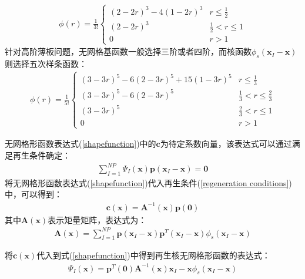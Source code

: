 \documentclass[a4paper]{ctexbook}
\begin{document}
\begin{equation}
\begin{split}
    \phi(r)=\frac{1}{3!}
\begin{cases}
    (2-2r)^3-4(1-2r)^3 &r\le \frac{1}{2}\\
    (2-2r)^3&\frac{1}{2}<r\le 1\\
    0&r>1
\end{cases}
\end{split}
\end{equation}
针对高阶薄板问题，无网格基函数一般选择三阶或者四阶，而核函数$\phi_s(\pmb{x}_I-\pmb{x})$则选择五次样条函数：
\begin{equation}
\begin{split}
    \phi(r)=\frac{1}{5!}
\begin{cases}
    (3-3r)^5-6(2-3r)^5+15(1-3r)^5&r\le\frac{1}{3}\\
    (3-3r)^5-6(2-3r)^5&\frac{1}{3}<r\le\frac{2}{3}\\
    (3-3r)^5&\frac{2}{3}<r\le1\\
    0&r>1
\end{cases}
\end{split}
\end{equation}\par
无网格形函数表达式(\ref{shapefunction})中的$\pmb{c}$为待定系数向量，该表达式可以通过满足再生条件确定：
\begin{equation}\label{regeneration conditions}
\begin{split}
    \sum_{I=1}^{N\!P}\Psi_I(\pmb{x})\pmb{p}(\pmb{x}_I-\pmb{x})=\pmb{0}
\end{split}
\end{equation}
将无网格形函数表达式(\ref{shapefunction})代入再生条件(\ref{regeneration conditions})中，可以得到：
\begin{equation}
\begin{split}
    \pmb{c}(\pmb{x})=\pmb{A}^{-1}(\pmb{x})\pmb{p}(\pmb{0})
\end{split}
\end{equation}
其中$\pmb{A}(\pmb{x})$表示矩量矩阵，表达式为：
\begin{equation}
\begin{split}
    \pmb{A}(\pmb{x})=\sum_{I=1}^{N\!P}\pmb{p}(\pmb{x}_I-\pmb{x})\pmb{p}^T(\pmb{x}_I-\pmb{x})\phi_s(\pmb{x}_I-\pmb{x})
\end{split}
\end{equation}\par
将$\pmb{c}(\pmb{x})$代入到式(\ref{shapefunction})中得到再生核无网格形函数的表达式：
\begin{equation}
\begin{split}
    \Psi_I(\pmb{x})=\pmb{p}^T(\pmb{0})\pmb{A}^{-1}(\pmb{x})\pmb{x}_I-\pmb{x}\phi_s(\pmb{x}_I-\pmb{x})
\end{split}
\end{equation}\par
\end{document}
